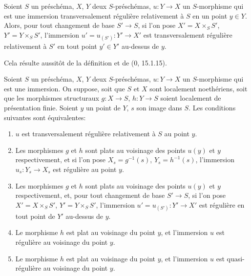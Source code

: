 \begin{proposition}[19.2.3]
\label{IV.19.2.3}
Soient $S$ un préschéma, $X$, $Y$ deux $S$-préschémas, $u:Y\to X$ un $S$-morphisme qui est une immersion transversalement régulière relativement à $S$ en un point $y\in Y$. Alors, pour tout changement de base $S'\to S$, si l'on pose $X'=X\times_S S'$, $Y'=Y\times_S S'$, l'immersion $u'=u_{(S')}:Y'\to X'$ est transversalement régulière relativement à $S'$ en tout point $y'\in Y'$ au-dessus de $y$.
\end{proposition}

Cela résulte aussitôt de la définition et de ($0$, 15.1.15).

\begin{proposition}[19.2.4]
\label{IV.19.2.4}
Soient $S$ un préschéma, $X$, $Y$ deux $S$-préschémas, $u:Y\to X$ un $S$-morphisme qui est une immersion. On suppose, soit que $S$ et $X$ sont localement noethériens, soit que les morphismes structuraux $g:X\to S$, $h:Y\to S$ soient localement de présentation finie. Soient $y$ un point de $Y$, $s$ son image dans $S$. Les conditions suivantes sont équivalentes:
\begin{enumerate}
  \item[a)] $u$ est transversalement régulière relativement à $S$ au point $y$.
  \item[b)] Les morphismes $g$ et $h$ sont plats au voisinage des points $u(y)$ et $y$ respectivement, et si l'on pose $X_s=g^{-1}(s)$, $Y_s=h^{-1}(s)$, l'immersion $u_s:Y_s\to X_s$ est régulière au point $y$.
  \item[b$'$)] Les morphismes $g$ et $h$ sont plats au voisinage des points $u(y)$ et $y$ respectivement, et, pour tout changement de base $S'\to S$, si l'on pose $X'=X\times_S S'$, $Y'=Y\times_S S'$, l'immersion $u'=u_{(S')}:Y'\to X'$ est régulière en tout point de $Y'$ au-dessus de $y$.
  \item[c)] Le morphisme $h$ est plat au voisinage du point $y$, et l'immersion $u$ est régulière au voisinage du point $y$.


  \item[c$'$)] Le morphisme $h$ est plat au voisinage du point $y$, et l'immersion $u$ est quasi-régulière au voisinage du point $y$.
\end{enumerate}
\end{proposition}

